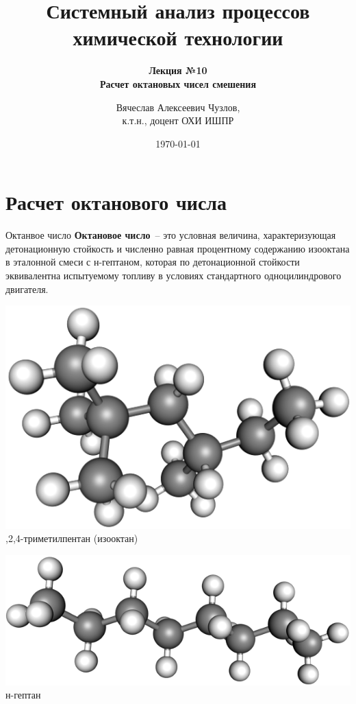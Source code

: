 \documentclass[aspectratio=169, mathserif]{beamer}%
\title{\LARGE{Системный анализ процессов химической технологии}}
\subtitle{\textcolor{tpugreen}{\textbf{Лекция №10}} \\ \textbf{Расчет октановых чисел смешения}}
\author[]{Вячеслав Алексеевич Чузлов, \\
к.т.н., доцент ОХИ ИШПР}
\date{\today}
\begin{document}

\titleframe%



\section{Расчет октанового числа}
\sectionframe

\begin{frame}[fragile, label=c]{Октанвое число}
\scriptsize
\textcolor{tpugreen}{\textbf{Октановое число}}~-- это условная величина, характеризующая детонационную стойкость и численно равная процентному содержанию изооктана в эталонной смеси с н-гептаном, которая по детонационной стойкости эквивалентна испытуемому топливу в условиях стандартного одноцилиндрового двигателя.
\vfill
{}
\vfill
\begin{minipage}{.48\textwidth}
\includegraphics[width=.95\linewidth]{./pics/ic8}
,2,4-триметилпентан (изооктан)
\end{minipage}
\begin{minipage}{.01\textwidth}
\hfill
\end{minipage}
\begin{minipage}{.48\textwidth}
\includegraphics[width=\linewidth]{./pics/nc7}
\centering н-гептан
\end{minipage}
\vfill
\end{frame}
\end{document}
